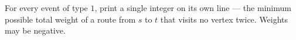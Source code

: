 For every event of type $1$, print a single integer on its own line --- the minimum possible total weight of a route from $s$ to $t$ that visits no vertex twice. Weights may be negative.
